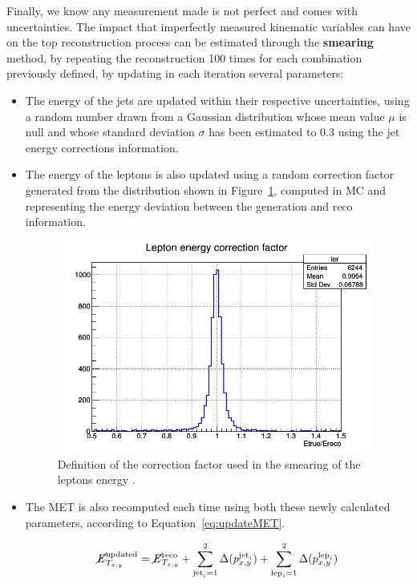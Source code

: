 \documentclass[a4paper, 10pt, openright]{report}
\begin{document}
Finally, we know any measurement made is not perfect and comes with uncertainties. The impact that imperfectly measured kinematic variables can have on the top reconstruction process can be estimated through the \textbf{smearing} method, by repeating the reconstruction 100 times for each combination previously defined, by updating in each iteration several parameters:
\begin{itemize}
\item The energy of the jets are updated within their respective uncertainties, using a random number drawn from a Gaussian distribution whose mean value $\mu$ is null and whose standard deviation $\sigma$ has been estimated to 0.3 using the jet energy corrections information.

\item The energy of the leptons is also updated using a random correction factor generated from the distribution shown in Figure~\ref{fig:lepsmearing}, computed in \ac{MC} and representing the energy deviation between the generation and reco information.

\begin{figure}[htbp]
\centering
\includegraphics[width=10.5cm, height=7cm]{figs/ler.png}
\caption{Definition of the correction factor used in the smearing of the leptons energy \cite{DESYAN}.}
\label{fig:lepsmearing}
\end{figure}

\item The \ac{MET} is also recomputed each time using both these newly calculated parameters, according to Equation~\ref{eq:updateMET}.

\begin{equation}
\label{eq:updateMET}
\cancel{E}_{T_{x,y}}^{\text{updated}} = \cancel{E}_{T_{x,y}}^{\text{reco}} + \sum_{\text{jet}_i = 1}^{2} \Delta(p_{x,y}^{\text{jet}_i}) + \sum_{\text{lep}_i = 1}^{2} \Delta(p_{x,y}^{\text{lep}_i})
\end{equation}


\end{itemize}
\end{document}
